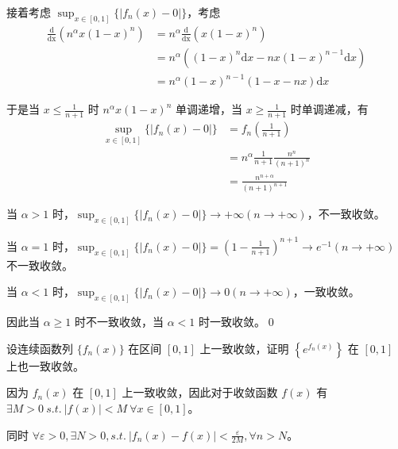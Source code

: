 接着考虑 $\displaystyle \sup _{x\in [ 0,1]}\{|f_{n}( x) -0|\}$，考虑
\begin{align*}
	\mathrm{\frac{d}{dx}}\left( n^{\alpha } x( 1-x)^{n}\right) & =n^{\alpha }\mathrm{\frac{d}{dx}}\left( x( 1-x)^{n}\right)\\
	& =n^{\alpha }\left(( 1-x)^{n}\mathrm{d} x-nx( 1-x)^{n-1}\mathrm{d} x\right)\\
	& =n^{\alpha }( 1-x)^{n-1}( 1-x-nx)\mathrm{d} x
\end{align*}


于是当 $\displaystyle x\leqslant \frac{1}{n+1}$ 时 $\displaystyle n^{\alpha } x( 1-x)^{n}$ 单调递增，当 $\displaystyle x\geqslant \frac{1}{n+1}$ 时单调递减，有
\begin{align*}
	\sup _{x\in [ 0,1]}\{|f_{n}( x) -0|\} & =f_{n}\left(\frac{1}{n+1}\right)\\
	& =n^{\alpha }\frac{1}{n+1}\frac{n^{n}}{( n+1)^{n}}\\
	& =\frac{n^{n+\alpha }}{( n+1)^{n+1}}
\end{align*}


当 $\displaystyle \alpha  >1$ 时，$\displaystyle \sup _{x\in [ 0,1]}\{|f_{n}( x) -0|\}\rightarrow +\infty \left( n\rightarrow +\infty \right)$，不一致收敛。

当 $\displaystyle \alpha =1$ 时，$\displaystyle \sup _{x\in [ 0,1]}\{|f_{n}( x) -0|\} =\left( 1-\frac{1}{n+1}\right)^{n+1}\rightarrow e^{-1}\left( n\rightarrow +\infty \right)$ 不一致收敛。

当 $\displaystyle \alpha < 1$ 时，$\displaystyle \sup _{x\in [ 0,1]}\{|f_{n}( x) -0|\}\rightarrow 0\left( n\rightarrow +\infty \right)$，一致收敛。

因此当 $\displaystyle \alpha \geqslant 1$ 时不一致收敛，当 $\displaystyle \alpha < 1$ 时一致收敛。\qed 







\begin{ques}
	设连续函数列 $\displaystyle \{f_{n}( x)\}$ 在区间 $\displaystyle [ 0,1]$ 上一致收敛，证明 $\displaystyle \left\{e^{f_{n}( x)}\right\}$ 在 $\displaystyle [ 0,1]$ 上也一致收敛。
\end{ques}



因为 $\displaystyle f_{n}( x)$ 在 $\displaystyle [ 0,1]$ 上一致收敛，因此对于收敛函数 $\displaystyle f( x)$ 有 $\displaystyle \exists M >0\ s.t.\ |f( x) |< M\ \forall x\in [ 0,1]$。

同时 $\displaystyle \forall \varepsilon  >0,\exists N >0,s.t.\ |f_{n}( x) -f( x) |< \frac{\varepsilon }{2M} ,\forall n >N$。

